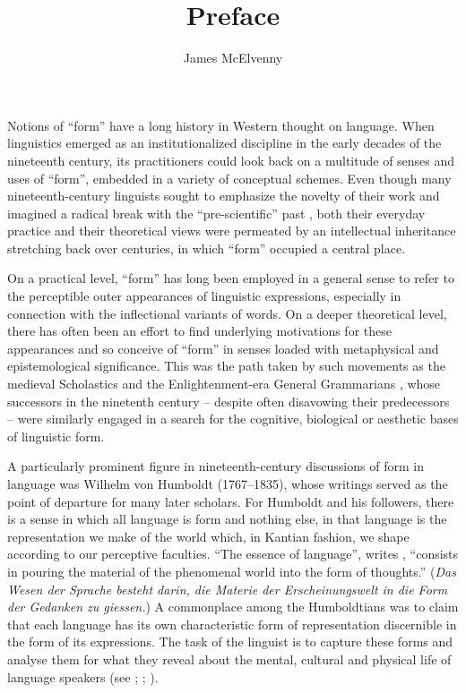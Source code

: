 \documentclass[output=paper]{langscibook}
\author{James McElvenny \affiliation{University of Edinburgh}}
\title{Preface}
\begin{document}
\maketitle
Notions of ``form'' have a long history in Western thought on language. When linguistics emerged as an institutionalized discipline in the early decades of the nineteenth century, its practitioners could look back on a multitude of senses and uses of ``form'', embedded in a variety of conceptual schemes. Even though many nineteenth-century linguists sought to emphasize the novelty of their work and imagined a radical break with the ``pre-scientific'' past \citep[see][chap. 1]{MorpurgoDavies1998}, both their everyday practice and their theoretical views were permeated by an intellectual inheritance stretching back over centuries, in which ``form'' occupied a central place.

On a practical level, ``form'' has long been employed in a general sense to refer to the perceptible outer appearances of linguistic expressions, especially in connection with the inflectional variants of words. On a deeper theoretical level, there has often been an effort to find underlying motivations for these appearances and so conceive of ``form'' in senses loaded with metaphysical and epistemological significance. This was the path taken by such movements as the medieval Scholastics and the Enlightenment-era General Grammarians \citep[see][chaps. 8 and 11]{Law2003}, whose successors in the ninetenth century -- despite often disavowing their predecessors -- were similarly engaged in a search for the cognitive, biological or aesthetic bases of linguistic form. 

A particularly prominent figure in nineteenth-century discussions of form in language was Wilhelm von Humboldt (1767--1835), whose writings served as the point of departure for many later scholars. For Humboldt and his followers, there is a sense in which all language is form and nothing else, in that language is the representation we make of the world which, in Kantian fashion, we shape according to our perceptive faculties. ``The essence of language'', writes \citet[17]{Humboldt19051820}, ``consists in pouring the material of the phenomenal world into the form of thoughts.'' (\emph{Das Wesen der Sprache besteht darin, die Materie der Erscheinungswelt in die Form der Gedanken zu giessen.}) A commonplace among the Humboldtians was to claim that each language has its own characteristic form of representation discernible in the form of its expressions. The task of the linguist is to capture these forms and analyse them for what they reveal about the mental, cultural and physical life of language speakers (see \citealt[chap. 5]{MorpurgoDavies1998}; \citealt{Trabant1986}; \citealt{McElvenny2016}). 
\end{document}
